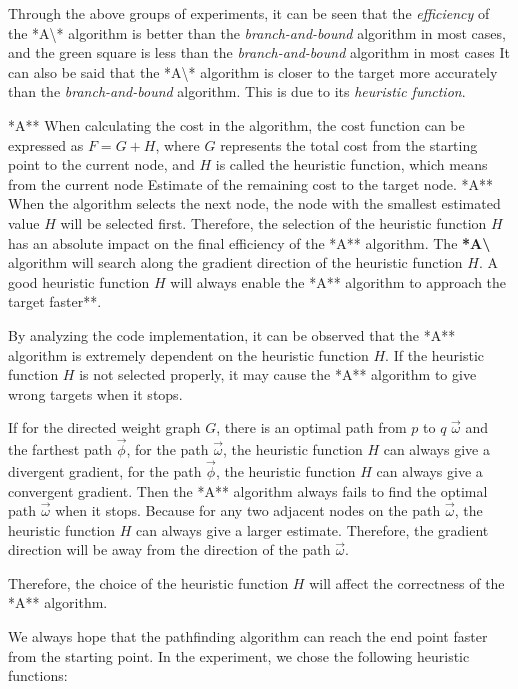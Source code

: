 \documentclass[
]{article}
\begin{document}
Through the above groups of experiments, it can be seen that the
\emph{efficiency} of the *A\textbackslash** algorithm is better than the
\emph{branch-and-bound} algorithm in most cases, and the green square is
less than the \emph{branch-and-bound} algorithm in most cases It can
also be said that the *A\textbackslash** algorithm is closer to the
target more accurately than the \emph{branch-and-bound} algorithm. This
is due to its \emph{heuristic function}.

*A** When calculating the cost in the algorithm, the cost function can
be expressed as \(F = G + H \), where \(G\) represents the total cost
from the starting point to the current node, and \(H\) is called the
heuristic function, which means from the current node Estimate of the
remaining cost to the target node. *A** When the algorithm selects the
next node, the node with the smallest estimated value \(H\) will be
selected first. Therefore, the selection of the heuristic function \(H\)
has an absolute impact on the final efficiency of the *A** algorithm.
The \textbf{*A\textbackslash{}} algorithm will search along the gradient
direction of the heuristic function \(H\). A good heuristic function
\(H\) will always enable the *A** algorithm to approach the target
faster**.

By analyzing the code implementation, it can be observed that the *A**
algorithm is extremely dependent on the heuristic function \(H\). If the
heuristic function \(H\) is not selected properly, it may cause the *A**
algorithm to give wrong targets when it stops.

If for the directed weight graph \(G\), there is an optimal path from
\(p\) to \(q\) \(\overrightarrow{\omega}\) and the farthest path
\(\overrightarrow{\phi}\), for the path \(\overrightarrow {\omega}\),
the heuristic function \(H\) can always give a divergent gradient, for
the path \(\overrightarrow{\phi}\), the heuristic function \(H\) can
always give a convergent gradient. Then the *A** algorithm always fails
to find the optimal path \(\overrightarrow{\omega}\) when it stops.
Because for any two adjacent nodes on the path
\(\overrightarrow{\omega}\), the heuristic function \(H\) can always
give a larger estimate. Therefore, the gradient direction will be away
from the direction of the path \(\overrightarrow{\omega}\).

Therefore, the choice of the heuristic function \(H\) will affect the
correctness of the *A** algorithm.

We always hope that the pathfinding algorithm can reach the end point
faster from the starting point. In the experiment, we chose the
following heuristic functions:
\end{document}
